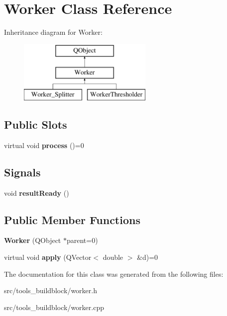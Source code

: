 \hypertarget{classWorker}{}\section{Worker Class Reference}
\label{classWorker}
Inheritance diagram for Worker\+:\begin{figure}[H]
\begin{center}
\leavevmode
\includegraphics[height=3.000000cm]{classWorker}
\end{center}
\end{figure}
\subsection*{Public Slots}
\begin{DoxyCompactItemize}
\item 
\mbox{\label{classWorker_abee6689b3ecc44de33d55dfae0a6af97}} 
virtual void {\bfseries process} ()=0
\end{DoxyCompactItemize}
\subsection*{Signals}
\begin{DoxyCompactItemize}
\item 
\mbox{\label{classWorker_a95f9f660a4f74f24ae5b8470fa1e4050}} 
void {\bfseries result\+Ready} ()
\end{DoxyCompactItemize}
\subsection*{Public Member Functions}
\begin{DoxyCompactItemize}
\item 
\mbox{\label{classWorker_a3290234525f8aad4f10f73305c9d1859}} 
{\bfseries Worker} (Q\+Object $\ast$parent=0)
\item 
\mbox{\label{classWorker_abb9cbb7748f7ce26ec78b9ae561e72d6}} 
virtual void {\bfseries apply} (Q\+Vector$<$ double $>$ \&d)=0
\end{DoxyCompactItemize}


The documentation for this class was generated from the following files\+:\begin{DoxyCompactItemize}
\item 
src/tools\+\_\+buildblock/worker.\+h\item 
src/tools\+\_\+buildblock/worker.\+cpp\end{DoxyCompactItemize}
